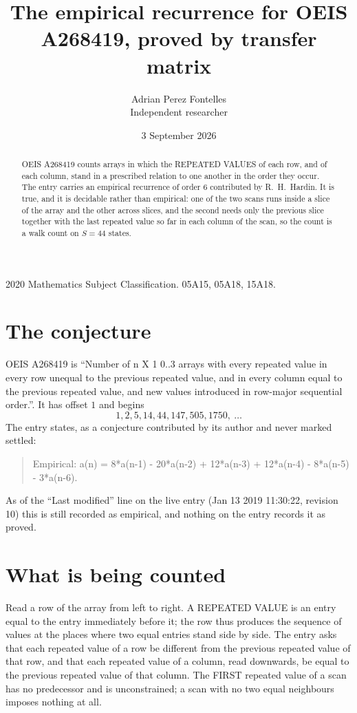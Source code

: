 \documentclass[11pt,a4paper]{article}
\title{The empirical recurrence for OEIS A268419, proved by transfer matrix}
\author{Adrian Perez Fontelles\\ \small Independent researcher}
\date{3 September 2026}
\theoremstyle{plain}
\theoremstyle{definition}
\begin{document}
\maketitle

\begin{abstract}
OEIS A268419 counts arrays in which the REPEATED VALUES of each row, and of each column, stand in a
prescribed relation to one another in the order they occur. The entry carries an empirical
recurrence of order $6$ contributed by R.~H.~Hardin. It is true, and it is decidable
rather than empirical: one of the two scans runs inside a slice of the array and the other
across slices, and the second needs only the previous slice together with the last repeated
value so far in each column of the scan, so the count is a walk count on $S=44$ states.
\end{abstract}

\noindent\small 2020 Mathematics Subject Classification. 05A15, 05A18, 15A18.\normalsize

\section{The conjecture}

OEIS A268419 is ``Number of n X 1 0..3 arrays with every repeated value in every row unequal to the previous repeated value, and in every column equal to the previous repeated value, and new values introduced in row-major sequential order.''. It has offset $1$ and begins
\[
1, 2, 5, 14, 44, 147, 505, 1750,\ \dots
\]
The entry states, as a conjecture contributed by its author and never marked settled:
\begin{quote}
Empirical: a(n) = 8*a(n-1) - 20*a(n-2) + 12*a(n-3) + 12*a(n-4) - 8*a(n-5) - 3*a(n-6).
\end{quote}
As of the ``Last modified'' line on the live entry (Jan 13 2019 11:30:22, revision 10) this is still
recorded as empirical, and nothing on the entry records it as proved.

\section{What is being counted}

Read a row of the array from left to right. A REPEATED VALUE is an entry equal to the entry
immediately before it; the row thus produces the sequence of values at the places where two
equal entries stand side by side. The entry asks that each repeated value of a row be
different from the previous repeated value of that row, and that each repeated value of a column,
read downwards, be equal to the previous repeated value of that column. The FIRST repeated
value of a scan has no predecessor and is unconstrained; a scan with no two equal neighbours
imposes nothing at all.
\end{document}

